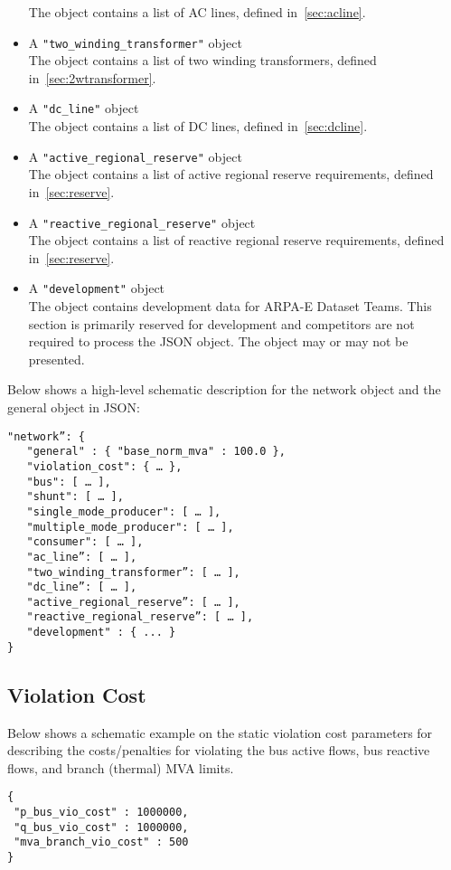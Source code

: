 \begin{itemize}
    The object contains a list of AC lines, defined in~\ref{sec:acline}.
    \item A \texttt{"two\_winding\_transformer"} object\\
    The object contains a list of two winding transformers, defined in~\ref{sec:2wtransformer}.
    \item A \texttt{"dc\_line"} object\\
    The object contains a list of DC lines, defined in~\ref{sec:dcline}.
    \item A \texttt{"active\_regional\_reserve"} object\\
    The object contains a list of active regional reserve requirements, defined in~\ref{sec:reserve}.
    \item A \texttt{"reactive\_regional\_reserve"} object\\
    The object contains a list of reactive regional reserve requirements, defined in~\ref{sec:reserve}.
    \item A \texttt{"development"} object\\
    The object contains development data for ARPA-E Dataset Teams. This section is primarily reserved for development and competitors are not required to process the JSON object. The object may or may not be presented. 
\end{itemize}

Below shows a high-level schematic description for the network object and the general object in JSON:
\begin{verbatim}
"network”: {
   "general" : { "base_norm_mva" : 100.0 },
   "violation_cost": { … },
   "bus": [ … ],
   "shunt": [ … ],
   "single_mode_producer": [ … ],
   "multiple_mode_producer": [ … ],
   "consumer": [ … ],
   "ac_line”: [ … ],
   "two_winding_transformer”: [ … ],
   "dc_line”: [ … ],   
   "active_regional_reserve”: [ … ],
   "reactive_regional_reserve”: [ … ],
   "development" : { ... }
}    
\end{verbatim}

\subsection{Violation Cost}
\label{sec:violation}
Below shows a schematic example on the static violation cost parameters for 
describing the costs/penalties for violating the bus active flows, bus reactive flows, 
and branch (thermal) MVA limits. 

\begin{verbatim}
{
 "p_bus_vio_cost" : 1000000,
 "q_bus_vio_cost" : 1000000,
 "mva_branch_vio_cost" : 500
}
\end{verbatim}


